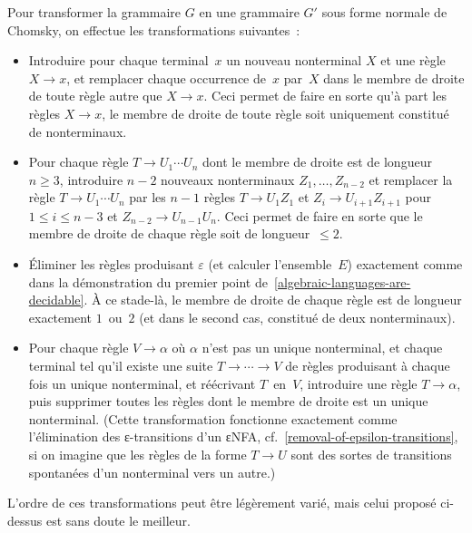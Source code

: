 \documentclass[12pt,a4paper]{article}
\theoremstyle{definition}
\begin{document}
{Pour transformer la grammaire $G$ en une grammaire $G'$ sous forme
normale de Chomsky, on effectue les transformations suivantes :
\begin{itemize}
\item Introduire pour chaque terminal $x$ un nouveau nonterminal $X$
  et une règle $X \rightarrow x$, et remplacer chaque occurrence
  de $x$ par $X$ dans le membre de droite de toute règle autre que $X
  \rightarrow x$.  Ceci permet de faire en sorte qu'à part les règles
  $X \rightarrow x$, le membre de droite de toute règle soit
  uniquement constitué de nonterminaux.
\item Pour chaque règle $T \rightarrow U_1 \cdots U_n$ dont le membre
  de droite est de longueur $n\geq 3$, introduire $n-2$ nouveaux
  nonterminaux $Z_1,\ldots, Z_{n-2}$ et remplacer la règle $T
  \rightarrow U_1 \cdots U_n$ par les $n-1$ règles $T \rightarrow U_1
  Z_1$ et $Z_i \rightarrow U_{i+1} Z_{i+1}$ pour $1\leq i\leq n-3$ et
  $Z_{n-2} \rightarrow U_{n-1} U_n$.  Ceci permet de faire en sorte
  que le membre de droite de chaque règle soit de longueur $\leq 2$.
\item Éliminer les règles produisant $\varepsilon$ (et calculer
  l'ensemble $E$) exactement comme dans la démonstration du premier
  point de \ref{algebraic-languages-are-decidable}.  À ce stade-là, le
  membre de droite de chaque règle est de longueur exactement
  $1$ ou $2$ (et dans le second cas, constitué de deux nonterminaux).
\item Pour chaque règle $V \rightarrow \alpha$ où $\alpha$ n'est pas
  un unique nonterminal, et chaque terminal tel qu'il existe une suite
  $T \rightarrow \cdots \rightarrow V$ de règles produisant à chaque
  fois un unique nonterminal, et réécrivant $T$ en $V$, introduire une
  règle $T \rightarrow \alpha$, puis supprimer toutes les règles dont
  le membre de droite est un unique nonterminal.  (Cette
  transformation fonctionne exactement comme l'élimination des
  ε-transitions d'un εNFA, cf. \ref{removal-of-epsilon-transitions},
  si on imagine que les règles de la forme $T \rightarrow U$ sont des
  sortes de transitions spontanées d'un nonterminal vers un autre.)
\end{itemize}

L'ordre de ces transformations peut être légèrement varié, mais celui
proposé ci-dessus est sans doute le meilleur.

\smallskip

}
\end{document}
